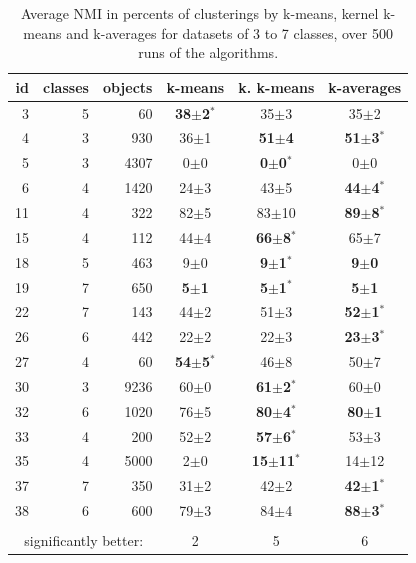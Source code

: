 \documentclass[twoside,11pt]{article}
\begin{document}
   
\begin{table} 
\begin{center} 
\caption{Average NMI in percents of clusterings by k-means, kernel k-means and k-averages for datasets of 3 to 7 classes, over 500 runs of the algorithms.}
\label{tab:results-37}
\begin{tabular}{rrrccc} 
id & classes & objects & k-means & k. k-means & k-averages \\ 
\hline 
 3 & 5 &   60 & \textbf{38$\pm$2$^*$} & 35$\pm$3 & 35$\pm$2 \\ 
 4 & 3 &  930 & 36$\pm$1 & \textbf{51$\pm$4} & \textbf{51$\pm$3$^*$} \\ 
 5 & 3 & 4307 & 0$\pm$0 & \textbf{0$\pm$0$^*$} & 0$\pm$0 \\ 
 6 & 4 & 1420 & 24$\pm$3 & 43$\pm$5 & \textbf{44$\pm$4$^*$} \\ 
11 & 4 &  322 &  82$\pm$5 & 83$\pm$10 & \textbf{ 89$\pm$8$^*$} \\ 
15 & 4 &  112 & 44$\pm$4 & \textbf{66$\pm$8$^*$} & 65$\pm$7 \\ 
18 & 5 &  463 & 9$\pm$0 & \textbf{9$\pm$1$^*$} & \textbf{9$\pm$0} \\ 
19 & 7 &  650 & \textbf{5$\pm$1} & \textbf{5$\pm$1$^*$} & \textbf{5$\pm$1} \\ 
22 & 7 &  143 & 44$\pm$2 & 51$\pm$3 & \textbf{52$\pm$1$^*$} \\ 
26 & 6 &  442 & 22$\pm$2 & 22$\pm$3 & \textbf{23$\pm$3$^*$} \\ 
27 & 4 &   60 & \textbf{54$\pm$5$^*$} & 46$\pm$8 & 50$\pm$7 \\ 
30 & 3 & 9236 & 60$\pm$0 & \textbf{61$\pm$2$^*$} & 60$\pm$0 \\ 
32 & 6 & 1020 & 76$\pm$5 & \textbf{80$\pm$4$^*$} & \textbf{80$\pm$1} \\ 
33 & 4 &  200 & 52$\pm$2 & \textbf{57$\pm$6$^*$} & 53$\pm$3 \\ 
35 & 4 & 5000 &   2$\pm$0 & \textbf{15$\pm$11$^*$} & 14$\pm$12 \\ 
37 & 7 &  350 & 31$\pm$2 & 42$\pm$2 & \textbf{42$\pm$1$^*$} \\ 
38 & 6 &  600 & 79$\pm$3 & 84$\pm$4 & \textbf{88$\pm$3$^*$} \\ 
\hline 
\vspace{-.2cm} \\
\multicolumn{3}{c}{significantly better:}  & 2 & 5 & 6 \\ 
\end{tabular} 
\end{center} 
\end{table} 
 
\end{document}
